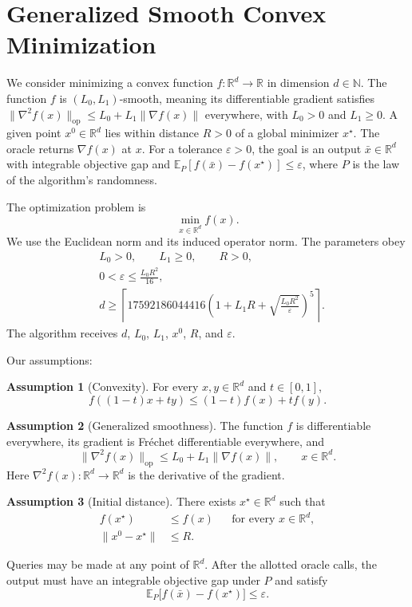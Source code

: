 \documentclass[10pt]{article}
\theoremstyle{definition}
\newtheorem{assumption}{Assumption}
\begin{document}
\section*{Generalized Smooth Convex Minimization}
We consider minimizing a convex function $f:\mathbb{R}^d\to\mathbb{R}$ in dimension $d\in\mathbb{N}$. The function $f$ is $(L_0,L_1)$-smooth, meaning its differentiable gradient satisfies $\|\nabla^2 f(x)\|_{\mathrm{op}}\leq L_0+L_1\|\nabla f(x)\|$ everywhere, with $L_0>0$ and $L_1\geq0$. A given point $x^0\in\mathbb{R}^d$ lies within distance $R>0$ of a global minimizer $x^\star$. The oracle returns $\nabla f(x)$ at $x$. For a tolerance $\varepsilon>0$, the goal is an output $\bar{x}\in\mathbb{R}^d$ with integrable objective gap and $\mathbb{E}_{P}[f(\bar{x})-f(x^\star)]\leq\varepsilon$, where $P$ is the law of the algorithm's randomness.

The optimization problem is
\[
\min_{x\in\mathbb{R}^d} f(x).
\]
We use the Euclidean norm and its induced operator norm. The parameters obey
\[
\begin{aligned}
&L_0>0,\qquad L_1\geq0,\qquad R>0,\\
&0<\varepsilon\leq\frac{L_0R^2}{16},\\
&d\geq\left\lceil
17592186044416\left(1+L_1R+\sqrt{\frac{L_0R^2}{\varepsilon}}\right)^5
\right\rceil.
\end{aligned}
\]
The algorithm receives $d$, $L_0$, $L_1$, $x^0$, $R$, and $\varepsilon$.

Our assumptions:
\begin{assumption}[Convexity]
For every $x,y\in\mathbb{R}^d$ and $t\in[0,1]$,
\[
f((1-t)x+ty)\leq(1-t)f(x)+tf(y).
\]
\end{assumption}

\begin{assumption}[Generalized smoothness]
The function $f$ is differentiable everywhere, its gradient is Fr\'echet differentiable everywhere, and
\[
\|\nabla^2 f(x)\|_{\mathrm{op}}
\leq L_0+L_1\|\nabla f(x)\|,
\qquad x\in\mathbb{R}^d.
\]
Here $\nabla^2 f(x):\mathbb{R}^d\to\mathbb{R}^d$ is the derivative of the gradient.
\end{assumption}

\begin{assumption}[Initial distance]
There exists $x^\star\in\mathbb{R}^d$ such that
\[
\begin{aligned}
f(x^\star)&\leq f(x) &&\text{for every }x\in\mathbb{R}^d,\\
\|x^0-x^\star\|&\leq R.
\end{aligned}
\]
\end{assumption}

Queries may be made at any point of $\mathbb{R}^d$. After the allotted oracle calls, the output must have an integrable objective gap under $P$ and satisfy
\[
\mathbb{E}_{P}\bigl[f(\bar{x})-f(x^\star)\bigr]\leq\varepsilon.
\]
\end{document}
